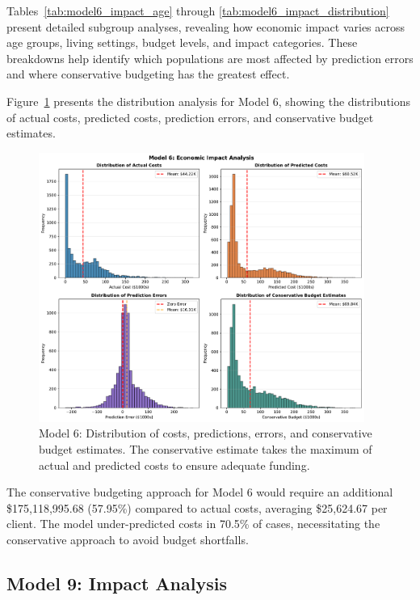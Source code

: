 Tables~\ref{tab:model6_impact_age} through \ref{tab:model6_impact_distribution} present detailed subgroup analyses, revealing how economic impact varies across age groups, living settings, budget levels, and impact categories. These breakdowns help identify which populations are most affected by prediction errors and where conservative budgeting has the greatest effect.

Figure~\ref{fig:model6_impact_histograms} presents the distribution analysis for Model 6, showing the distributions of actual costs, predicted costs, prediction errors, and conservative budget estimates.

\begin{figure}[htbp]
\centering
\includegraphics[width=0.95\textwidth]{figures/model_6_Impact_Histograms.pdf}
\caption{Model 6: Distribution of costs, predictions, errors, and conservative budget estimates. The conservative estimate takes the maximum of actual and predicted costs to ensure adequate funding.}
\label{fig:model6_impact_histograms}
\end{figure}

The conservative budgeting approach for Model 6 would require an additional \$175,118,995.68 (57.95\%) compared to actual costs, averaging \$25,624.67 per client. The model under-predicted costs in 70.5\% of cases, necessitating the conservative approach to avoid budget shortfalls. 

\clearpage

\subsection{Model 9: Impact Analysis}
\label{subsec:model9_impact}

